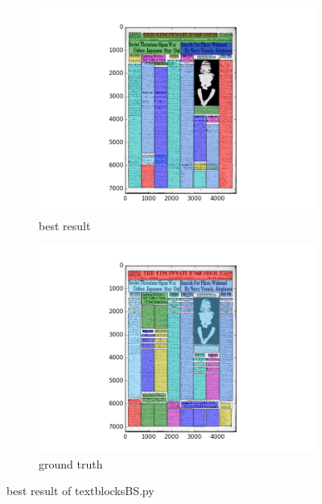 \documentclass[a4paper,10pt]{article}
\begin{document}
\newpage
	
					\begin{figure}
					\centering
					\begin{subfigure}{.5\textwidth}
					  \centering
					  \includegraphics[width=10cm]
					{textblocksBS.py.best.png}
					  \caption{best result}
					  \label{fig:sub1}
					\end{subfigure}%
					\begin{subfigure}{.5\textwidth}
					  \centering
					  \includegraphics[width=10cm]
					{textblocksBS.py.gt.best.png}
					  \caption{ground truth}
					  \label{fig:sub2}
					\end{subfigure}
					\caption
					{best result of textblocksBS.py}
					\label{fig:test}
					\end{figure}
						
\end{document}
